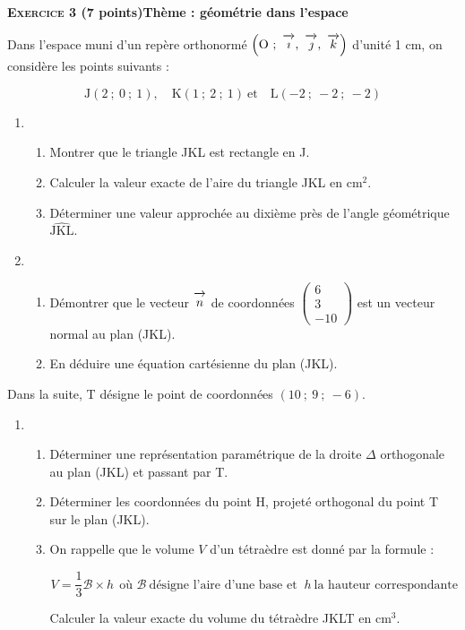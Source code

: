 \documentclass[10pt]{article}
\newcommand{\vect}[1]{\overrightarrow{\,\mathstrut#1\,}}
\def\Oijk{$\left(\text{O}~;~\vect{\imath},~\vect{\jmath},~\vect{k}\right)$}
\begin{document}
\bigskip

\textbf{\textsc{Exercice 3} \quad (7 points)\hfill Thème : géométrie dans l'espace}

\medskip

Dans l'espace muni d'un repère orthonormé \Oijk{} d'unité 1 cm, on considère les points suivants :

\[\text{J}(2~;~0~;~1), \quad \text{K}( 1~;~2~;~1)\:\text{et} \quad \text{L}(-2~;~-2~;~-2)\]

\begin{enumerate}
\item 
	\begin{enumerate}
		\item Montrer que le triangle JKL est rectangle en J.
		\item Calculer la valeur exacte de l'aire du triangle JKL en cm$^2$.
		\item Déterminer une valeur approchée au dixième près de l'angle géométrique $\widehat{\text{JKL}}$.
	\end{enumerate}
		
\item
	\begin{enumerate}
		\item Démontrer que le vecteur $\vect{n}$ de coordonnées $\begin{pmatrix}6\\3\\-10\end{pmatrix}$ est un vecteur normal au plan (JKL).
		\item En déduire une équation cartésienne du plan (JKL).
	\end{enumerate}
\end{enumerate}

Dans la suite, T désigne le point de coordonnées $(10~;~9~;~-6)$.

\begin{enumerate}[resume]
\item
	\begin{enumerate}
		\item Déterminer une représentation paramétrique de la droite $\Delta$
orthogonale au plan (JKL) et passant par T.
		\item Déterminer les coordonnées du point H, projeté orthogonal du point T sur le plan (JKL).
		\item On rappelle que le volume $V$ d'un tétraèdre est donné par la formule :
		
		\[V  = \dfrac13 \mathcal{B} \times h\:\: \text{où }  \mathcal{B}\:\text{désigne l'aire d'une base et } \: h \: \text{la hauteur correspondante}\]
		
Calculer la valeur exacte du volume du tétraèdre JKLT en cm$^3$.
	\end{enumerate}
\end{enumerate}
\end{document}
